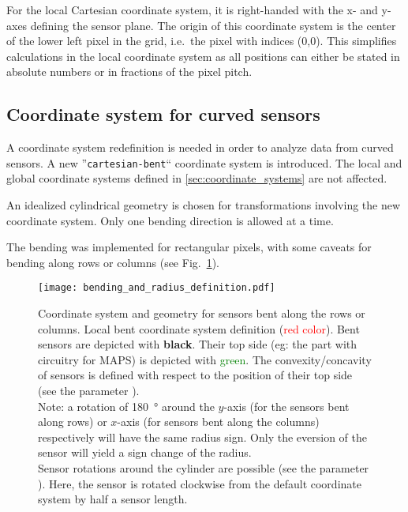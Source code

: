 For the local Cartesian coordinate system, it is right-handed with the x- and y-axes defining the sensor plane.  The origin of this coordinate system is the center of the lower left pixel in the grid, i.e.\ the pixel with indices (0,0).  This simplifies calculations in the local coordinate system as all positions can either be stated in absolute numbers or in fractions of the pixel pitch.

\subsection{Coordinate system for curved sensors}
\label{ssec:bentdetectors}

A coordinate system redefinition is needed in order to analyze data from curved sensors. A new ''\texttt{cartesian-bent}`` coordinate system is introduced. The local and global coordinate systems defined in \ref{sec:coordinate_systems} are not affected.

An idealized cylindrical geometry is chosen for transformations involving the new coordinate system. Only one bending direction is allowed at a time.

The bending was implemented for rectangular pixels, with some caveats for bending along rows or columns (see Fig.~\ref{fig:bent_coord_syst}). 


\begin{figure}[!htp]
\centering
  \texttt{[image: bending\_and\_radius\_definition.pdf]}
  \caption{Coordinate system and geometry for sensors bent along the rows or columns. Local bent coordinate system definition (\textcolor{red}{red color}). Bent sensors are depicted with \textbf{black}. Their top side (eg: the part with circuitry for MAPS) is depicted with \textcolor{green}{green}. The convexity/concavity of sensors is defined with respect to the position of their top side (see the parameter \protect{}). \\ Note: a rotation of \SI{180}{\degree} around the $y$-axis (for the sensors bent along rows) or $x$-axis (for sensors bent along the columns) respectively will have the same radius sign. Only the eversion of the sensor will yield a sign change of the radius. \\
  Sensor rotations around the cylinder are possible (see the parameter \protect{}). Here, the sensor is rotated clockwise from the default coordinate system by half a sensor length.}
\label{fig:bent_coord_syst}
\end{figure}


